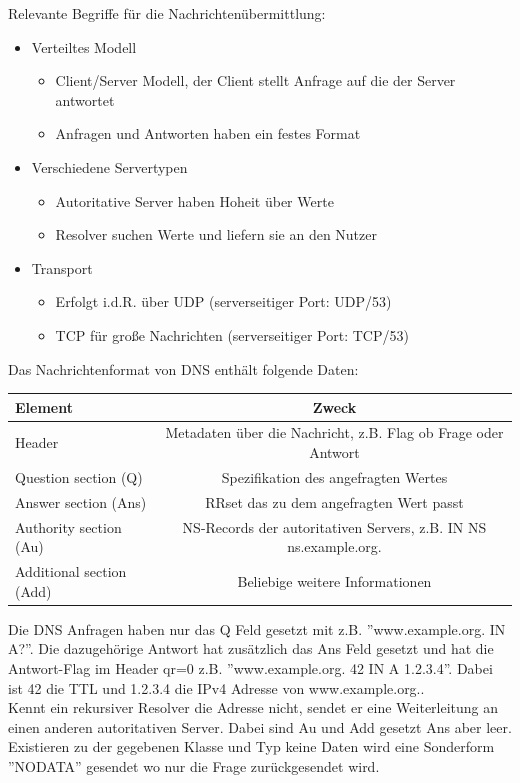 \documentclass[a4paper,12pt,leqno]{article}
\begin{document}
Relevante Begriffe für die Nachrichtenübermittlung:
\begin{itemize}
\item Verteiltes Modell
	\begin{itemize}
	\item Client/Server Modell, der Client stellt Anfrage auf die der Server antwortet
	\item Anfragen und Antworten haben ein festes Format
	\end{itemize}
\item Verschiedene Servertypen
	\begin{itemize}
	\item Autoritative Server haben Hoheit über Werte
	\item Resolver suchen Werte und liefern sie an den Nutzer
	\end{itemize}
\item Transport 
	\begin{itemize}
	\item Erfolgt i.d.R. über UDP (serverseitiger Port: UDP/53)
	\item TCP für große Nachrichten (serverseitiger Port: TCP/53)
	\end{itemize}
\end{itemize}

Das Nachrichtenformat von DNS enthält folgende Daten:\\

\begin{tabular}{|l|c|}
\hline
Element & Zweck\\
\hline
Header & Metadaten über die Nachricht, z.B. Flag ob Frage oder Antwort\\
Question section (Q) & Spezifikation des angefragten Wertes\\
Answer section (Ans) & RRset das zu dem angefragten Wert passt\\
Authority section (Au) & NS-Records der autoritativen Servers, z.B. IN NS ns.example.org.\\
Additional section (Add)& Beliebige weitere Informationen\\
\hline
\end{tabular}

Die DNS Anfragen haben nur das Q Feld gesetzt mit z.B. ''www.example.org. IN A?''. Die dazugehörige Antwort hat zusätzlich das Ans Feld gesetzt und hat die Antwort-Flag im Header qr=0 z.B. ''www.example.org. 42 IN A 1.2.3.4''. Dabei ist 42 die TTL und 1.2.3.4 die IPv4 Adresse von www.example.org..\\
Kennt ein rekursiver Resolver die Adresse nicht, sendet er eine Weiterleitung an einen anderen autoritativen Server. Dabei sind Au und Add gesetzt Ans aber leer.\\
Existieren zu der gegebenen Klasse und Typ keine Daten wird eine Sonderform ''NODATA'' gesendet wo nur die Frage zurückgesendet wird.
\end{document}
